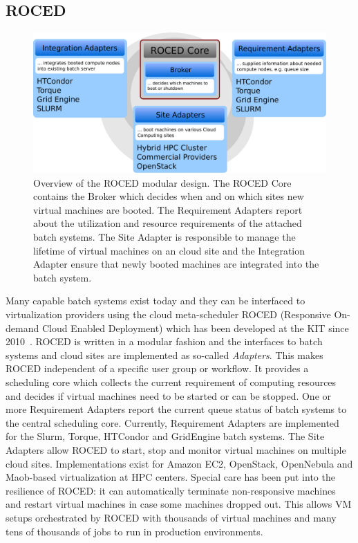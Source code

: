 \subsection{ROCED}
\begin{figure}
\begin{center}
  \includegraphics[width=0.9\linewidth]{figures/roced_design_flat.pdf}
  \caption{Overview of the ROCED modular design. The ROCED Core contains the Broker which decides when and on which sites new virtual machines are booted. The Requirement Adapters report about the utilization and resource requirements of the attached batch systems. The Site Adapter is responsible to manage the lifetime of virtual machines on an cloud site and the Integration Adapter ensure that newly booted machines are integrated into the batch system.}
  \label{fig-frplots}
\end{center}
\end{figure}

Many capable batch systems exist today and they can be interfaced to virtualization providers using the cloud meta-scheduler ROCED (Responsive On-demand Cloud Enabled Deployment) which has been developed at the KIT since 2010~\cite{ROCED}. ROCED is written in a modular
fashion and the interfaces to batch systems and cloud sites are implemented as so-called \textit{Adapters}. This makes ROCED independent of a specific user group or workflow. It provides a scheduling core which collects the current requirement of computing resources and decides if virtual machines need to be started or can be stopped. One or more Requirement Adapters report the current queue status of batch systems to the central scheduling core. Currently, Requirement Adapters are implemented for the Slurm, Torque, HTCondor and GridEngine batch systems. The Site Adapters allow ROCED to start, stop and monitor virtual machines on multiple cloud sites. Implementations exist for Amazon EC2, OpenStack, OpenNebula and Maob-based virtualization at HPC centers. Special care has been put into the resilience of ROCED: it can automatically terminate non-responsive machines and restart virtual machines in case some machines dropped out. This allows VM setups orchestrated by ROCED with thousands of virtual machines and many tens of thousands of jobs to run in production environments.


